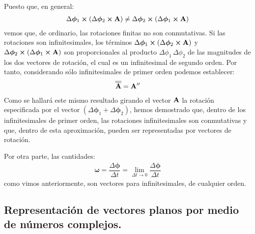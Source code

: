 \documentclass[12pt]{article}
\begin{document}
Puesto que, en general:
\begin{align*}
    \Delta \bm{\phi}_{1} \cp \left( \Delta \bm{\phi}_{2} \cp \vb{A} \right) \neq \Delta \bm{\phi}_{2} \cp \left( \Delta \bm{\phi}_{1} \cp \vb{A} \right)
\end{align*}
vemos que, de ordinario, las rotaciones finitas no son conmutativas. Si las rotaciones son infinitesimales, los términos $\Delta \bm{\phi}_{1} \cp \left( \Delta \bm{\phi}_{2} \cp \vb{A} \right)$ y $\Delta \bm{\phi}_{2} \cp \left( \Delta \bm{\phi}_{1} \cp \vb{A} \right)$ son proporcionales al producto $\Delta \phi_{1} \, \Delta \phi_{2}$ de las magnitudes de los dos vectores de rotación, el cual es un infinitesimal de 
segundo orden. Por tanto, considerando sólo infinitesimales de primer orden podemos establecer:
\begin{align*}
    \overline{\overline{\vb{A}}} = \vb{A}^{\prime \prime} 
\end{align*}
Como se hallará este mismo resultado girando el vector $\vb{A}$ la rotación especificada por el vector $\left( \Delta \bm{\phi}_{1} + \Delta \bm{\phi}_{2} \right)$, hemos demostrado que, dentro de los infinitesimales de primer orden, las rotaciones infinitesimales son conmutativas y que, dentro de esta aproximación, pueden ser representadas por vectores de rotación. 
\par
Por otra parte, las cantidades:
\begin{align}
    \bm{\omega} = \dfrac{\Delta \bm{\phi}}{\Delta t} = \lim_{\Delta t \to 0} \dfrac{\Delta \bm{\phi}}{\Delta t}
    \label{eq:ecuacion_01_77}
\end{align}
como vimos anteriormente, son vectores para infinitesimales, de cualquier orden.

\subsection{Representación de vectores planos por medio de números complejos.}
\end{document}
